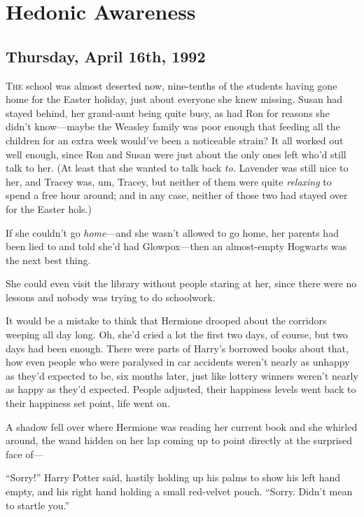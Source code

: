 \chapter{Hedonic Awareness}

\section{Thursday, April 16th, 1992}

\lettrine{T}{he} school was almost deserted now, nine-tenths of the students having gone home for the Easter holiday, just about everyone she knew missing. Susan had stayed behind, her grand-aunt being quite busy, as had Ron for reasons she didn’t know—maybe the Weasley family was poor enough that feeding all the children for an extra week would’ve been a noticeable strain? It all worked out well enough, since Ron and Susan were just about the only ones left who’d still talk to her. (At least that she wanted to talk back \emph{to.} Lavender was still nice to her, and Tracey was, um, Tracey, but neither of them were quite \emph{relaxing} to spend a free hour around; and in any case, neither of those two had stayed over for the Easter hols.)

If she couldn’t go \emph{home}—and she wasn’t allowed to go home, her parents had been lied to and told she’d had Glowpox—then an almost-empty Hogwarts was the next best thing.

She could even visit the library without people staring at her, since there were no lessons and nobody was trying to do schoolwork.

It would be a mistake to think that Hermione drooped about the corridors weeping all day long. Oh, she’d cried a lot the first two days, of course, but two days had been enough. There were parts of Harry’s borrowed books about that, how even people who were paralysed in car accidents weren’t nearly as unhappy as they’d expected to be, six months later, just like lottery winners weren’t nearly as happy as they’d expected. People adjusted, their happiness levels went back to their happiness set point, life went on.

A shadow fell over where Hermione was reading her current book and she whirled around, the wand hidden on her lap coming up to point directly at the surprised face of—

“Sorry!” Harry Potter said, hastily holding up his palms to show his left hand empty, and his right hand holding a small red-velvet pouch. “Sorry. Didn’t mean to startle you.”

